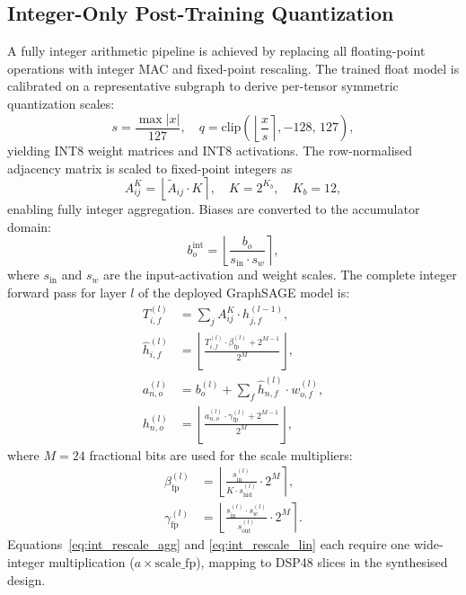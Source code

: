 \documentclass{IEEEtran}
\begin{document}
\subsection{Integer-Only Post-Training Quantization}
\label{sec:int8ptq}

A fully integer arithmetic pipeline is achieved by replacing all floating-point operations with integer MAC and fixed-point rescaling. The trained float model is calibrated on a representative subgraph to derive per-tensor symmetric quantization scales:
\begin{equation}
    s = \frac{\max|x|}{127},\quad
    q = \mathrm{clip}\!\left(\!\left\lfloor\frac{x}{s}\right\rceil,-128,\,127\right),
    \label{eq:int8_quant}
\end{equation}
yielding INT8 weight matrices and INT8 activations. The row-normalised adjacency matrix is scaled to fixed-point integers as
\begin{equation}
    A^K_{ij} = \left\lfloor \tilde{A}_{ij}\cdot K \right\rceil,\quad K = 2^{K_b},\quad K_b = 12,
    \label{eq:adj_int}
\end{equation}
enabling fully integer aggregation. Biases are converted to the accumulator domain:
\begin{equation}
    b^{\mathrm{int}}_o = \left\lfloor \frac{b_o}{s_{\mathrm{in}}\cdot s_w} \right\rceil,
    \label{eq:bias_int}
\end{equation}
where $s_{\mathrm{in}}$ and $s_w$ are the input-activation and weight scales. The complete integer forward pass for layer $l$ of the deployed GraphSAGE model is:
\begin{align}
    T_{i,f}^{(l)} &= \sum_{j} A^K_{ij}\cdot h_{j,f}^{(l-1)}, \label{eq:int_agg}\\
    \hat{h}_{i,f}^{(l)} &= \left\lfloor \frac{T_{i,f}^{(l)}\cdot\beta^{(l)}_{\mathrm{fp}} + 2^{M-1}}{2^M} \right\rfloor, \label{eq:int_rescale_agg}\\
    a_{n,o}^{(l)} &= b_o^{(l)} + \sum_{f} \hat{h}_{n,f}^{(l)}\cdot w^{(l)}_{o,f}, \label{eq:int_lin}\\
    h_{n,o}^{(l)} &= \left\lfloor \frac{a_{n,o}^{(l)}\cdot\gamma^{(l)}_{\mathrm{fp}} + 2^{M-1}}{2^M} \right\rfloor, \label{eq:int_rescale_lin}
\end{align}
where $M=24$ fractional bits are used for the scale multipliers:
\begin{align}
    \beta^{(l)}_{\mathrm{fp}} &= \left\lfloor \frac{s^{(l)}_{\mathrm{in}}}{K\cdot s^{(l)}_{\mathrm{hid}}} \cdot 2^M \right\rceil, \label{eq:beta_fp}\\
    \gamma^{(l)}_{\mathrm{fp}} &= \left\lfloor \frac{s^{(l)}_{\mathrm{in}}\cdot s^{(l)}_w}{s^{(l)}_{\mathrm{out}}} \cdot 2^M \right\rceil. \label{eq:gamma_fp}
\end{align}
Equations~\eqref{eq:int_rescale_agg} and \eqref{eq:int_rescale_lin} each require one wide-integer multiplication ($a \times \text{scale\_fp}$), mapping to DSP48 slices in the synthesised design.
\end{document}
